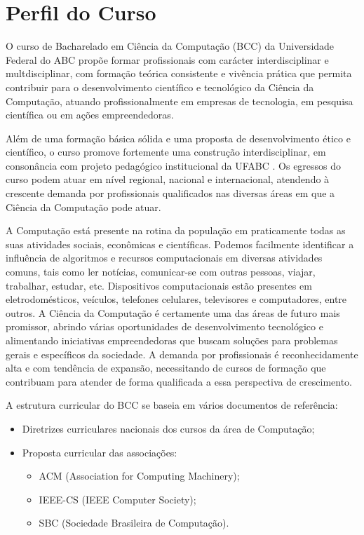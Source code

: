 \section {Perfil do Curso}

O curso de Bacharelado em Ciência da Computação (BCC) da Universidade Federal do ABC propõe formar profissionais com carácter interdisciplinar e multdisciplinar, com formação teórica consistente e vivência prática que permita contribuir para o desenvolvimento científico e tecnológico da Ciência da Computação, atuando profissionalmente em empresas de tecnologia, em pesquisa científica ou em ações empreendedoras.

Além de uma formação básica sólida e uma proposta de desenvolvimento ético e científico, o curso promove fortemente uma construção interdisciplinar, em consonância com projeto pedagógico institucional da UFABC . Os egressos do curso podem atuar em nível regional, nacional e internacional, atendendo à crescente demanda por profissionais qualificados nas diversas  áreas em que a Ciência da Computação pode atuar.

A Computação está presente na rotina da população em praticamente todas as suas atividades sociais, econômicas e científicas. Podemos facilmente identificar a influência de algoritmos e recursos computacionais em diversas atividades comuns, tais como ler notícias, comunicar-se com outras pessoas, viajar, trabalhar, estudar, etc. Dispositivos computacionais estão presentes em eletrodomésticos, veículos, telefones celulares, televisores e computadores, entre outros. A Ciência da Computação é certamente uma das áreas de futuro mais promissor, abrindo várias oportunidades de desenvolvimento tecnológico e alimentando iniciativas empreendedoras que buscam soluções para problemas gerais e específicos da sociedade. A demanda por profissionais é reconhecidamente alta e com tendência de expansão, necessitando de cursos de formação que contribuam para atender de forma qualificada a essa perspectiva de crescimento.

A estrutura curricular do BCC se baseia em vários documentos de referência:
\begin{itemize}
	\item Diretrizes curriculares nacionais dos cursos da área de Computação;
	\item Proposta curricular das associações:
	\begin{itemize}
		\item ACM (Association for Computing Machinery);
		\item IEEE-CS (IEEE Computer Society);
		\item SBC (Sociedade Brasileira de Computação).
	\end{itemize}
\end{itemize}


